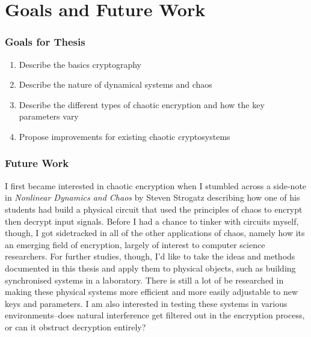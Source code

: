\chapter{Goals and Future Work}

\subsection{Goals for Thesis}

\begin{enumerate}
	\item Describe the basics cryptography 
	\item Describe the nature of dynamical systems and chaos
	\item Describe the different types of chaotic encryption and how the key parameters vary
	\item Propose improvements for existing chaotic cryptosystems
\end{enumerate}

\subsection{Future Work}

I first became interested in chaotic encryption when I stumbled across a side-note in \textit{Nonlinear Dynamics and Chaos} by Steven Strogatz describing how one of his students had build a physical circuit that used the principles of chaos to encrypt then decrypt input signals.  Before I had a chance to tinker with circuits myself, though, I got sidetracked in all of the other applications of chaos, namely how its an emerging field of encryption, largely of interest to computer science researchers.  For further studies, though, I'd like to take the ideas and methods documented in this thesis and apply them to physical objects, such as building synchronised systems in a laboratory.  There is still a lot of be researched in making these physical systems more efficient and more easily adjustable to new keys and parameters.  I am also interested in testing these systems in various environments--does natural interference get filtered out in the encryption process, or can it obstruct decryption entirely?